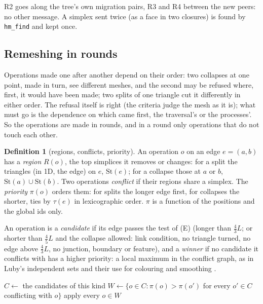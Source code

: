 \documentclass[10pt,a4paper]{article}
\theoremstyle{definition}
\newtheorem{definition}{Definition}
\newcommand{\fn}[1]{\texttt{#1}}
\begin{document}
R2 goes along the tree's own migration pairs, R3 and R4 between the new
peers: no other message. A simplex sent twice (as a face in two closures)
is found by \fn{hm\_find} and kept once.

\subsection{Remeshing in rounds}
\label{sec:part-remesh}

Operations made one after another depend on their order: two collapses at
one point, made in turn, see different meshes, and the second may be
refused where, first, it would have been made; two splits of one triangle
cut it differently in either order. The refusal itself is right (the
criteria judge the mesh as it is); what must go is the dependence on which
came first, the traversal's or the processes'. So the operations are made
in rounds, and in a round only operations that do not touch each other.

\begin{definition}[regions, conflicts, priority]
  \label{def:region}
  An operation $o$ on an edge $e = (a, b)$ has a \emph{region} $R(o)$,
  the top simplices it removes or changes: for a split the triangles (in
  1D, the edge) on $e$, $\mathrm{St}(e)$; for a collapse those at $a$ or
  $b$, $\mathrm{St}(a) \cup \mathrm{St}(b)$. Two operations
  \emph{conflict} if their regions share a simplex. The \emph{priority}
  $\pi(o)$ orders them: for splits the longer edge first, for collapses
  the shorter, ties by $\tau(e)$ in lexicographic order. $\pi$ is a
  function of the positions and the global ids only.
\end{definition}

An operation is a \emph{candidate} if its edge passes the test of (E)
(longer than $\tfrac43 L$; or shorter than $\tfrac45 L$ and the collapse
allowed: link condition, no triangle turned, no edge above $\tfrac43 L$,
no junction, boundary or feature), and a \emph{winner} if no candidate it
conflicts with has a higher priority: a local maximum in the conflict
graph, as in Luby's independent sets \cite{luby} and their use for
colouring and smoothing \cite{jones, freitagpar}.

\begin{algorithm}[H]
  \caption{\textsc{Rounds}(kind), one process}
  \label{alg:rounds}
  \begin{algorithmic}[1]
    \Repeat
      \State $C \gets$ the candidates of this kind 
      \State $W \gets \{ o \in C : \pi(o) > \pi(o')$ for every $o' \in C$
        conflicting with $o \}$
      \State apply every $o \in W$ 
  \end{algorithmic}
\end{algorithm}
\end{document}
